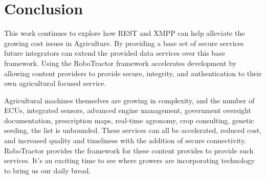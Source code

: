 \documentclass[conference,12pt]{IEEEtran}
\begin{document}
\section{Conclusion}
This work continues to explore how REST and XMPP can help alleviate the growing
cost issues in Agriculture. By providing a base set of secure services future
integrators can extend the provided data services over this base framework.
Using the RoboTractor framework accelerates development by allowing content
providers to provide secure, integrity, and authentication to their own
agricultural focused service. 

Agricultural machines themselves are growing in complexity, and the number of ECUs,
integrated sensors, advanced engine management, government oversight
documentation, prescription maps, real-time agronomy, crop consulting, genetic
seeding, the list is unbounded. These services can all be accelerated, reduced
cost, and increased quality and timeliness with the addition of secure
connectivity. RoboTractor provides the framework for these content provides to
provide such services. It's an exciting time to see where growers are
incorporating technology to bring us our daily bread.
\end{document}
